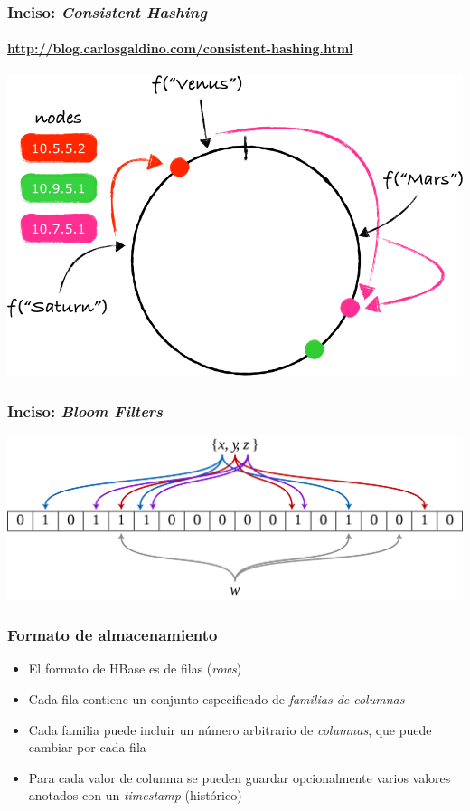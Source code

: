 \documentclass[14pt]{beamer}
\begin{document}
\begin{frame}
  \frametitle{Inciso: {\em Consistent Hashing}}
\framesubtitle{\url{http://blog.carlosgaldino.com/consistent-hashing.html}}
  \includegraphics[width=\textwidth]{img/consistent-hashing}
\end{frame}

\begin{frame}
  \frametitle{Inciso: {\em Bloom Filters}}
\includegraphics[width=\textwidth]{img/bloom_filter}
\end{frame}

\begin{frame}[allowframebreaks]
  \frametitle{Formato de almacenamiento}
  \begin{itemize}
  \item El formato de HBase es de filas ({\em rows})
\item Cada fila contiene un conjunto especificado de {\em familias de
  columnas}
\item  Cada familia puede incluir un número arbitrario de {\em columnas},
  que puede cambiar por cada fila
\item Para cada valor de columna se pueden guardar opcionalmente varios
  valores anotados con un {\em timestamp} (histórico)
  \end{itemize}
\end{frame}
\end{document}
